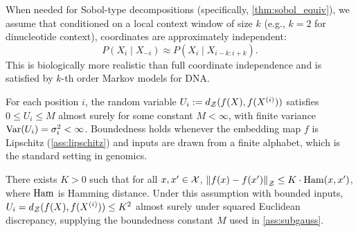 \begin{assumption}\label{ass:condind}
When needed for Sobol-type decompositions (specifically, \cref{thm:sobol_equiv}), we assume that conditioned on a local context window of size $k$ (e.g., $k=2$ for dinucleotide context), coordinates are approximately independent:
\[
P(X_i \mid X_{-i}) \approx P(X_i \mid X_{i-k:i+k}).
\]
This is biologically more realistic than full coordinate independence and is satisfied by $k$-th order Markov models for DNA.
\end{assumption}

\begin{assumption}\label{ass:subgauss}
For each position $i$, the random variable $U_i := d_{\mathcal{Z}}(f(X), f(X^{(i)}))$ satisfies $0 \le U_i \le M$ almost surely for some constant $M < \infty$, with finite variance $\operatorname{Var}(U_i) = \sigma_i^2 < \infty$. Boundedness holds whenever the embedding map $f$ is Lipschitz (\cref{ass:lipschitz}) and inputs are drawn from a finite alphabet, which is the standard setting in genomics.
\end{assumption}

\begin{assumption}\label{ass:lipschitz}
There exists $K>0$ such that for all $x,x'\in\mathcal{X}$,
$\left\lVert f(x)-f(x') \right\rVert_{\mathcal{Z}} \le K \cdot \operatorname{Ham}(x,x')$,
where $\operatorname{Ham}$ is Hamming distance. Under this assumption with bounded inputs, $U_i = d_{\mathcal{Z}}(f(X),f(X^{(i)})) \le K^2$ almost surely under squared Euclidean discrepancy, supplying the boundedness constant $M$ used in \cref{ass:subgauss}.
\end{assumption}

